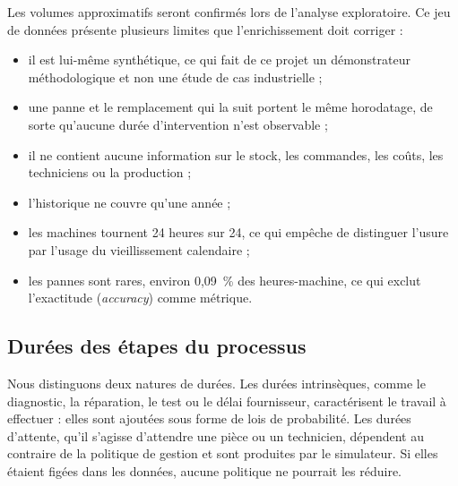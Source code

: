 \documentclass[11pt,a4paper]{article}
\begin{document}
Les volumes approximatifs seront confirmés lors de l'analyse exploratoire. Ce jeu de données présente plusieurs limites que l'enrichissement doit corriger :
\begin{itemize}
\item il est lui-même synthétique, ce qui fait de ce projet un démonstrateur méthodologique et non une étude de cas industrielle ;
\item une panne et le remplacement qui la suit portent le même horodatage, de sorte qu'aucune durée d'intervention n'est observable ;
\item il ne contient aucune information sur le stock, les commandes, les coûts, les techniciens ou la production ;
\item l'historique ne couvre qu'une année ;
\item les machines tournent 24 heures sur 24, ce qui empêche de distinguer l'usure par l'usage du vieillissement calendaire ;
\item les pannes sont rares, environ 0,09~\% des heures-machine, ce qui exclut l'exactitude (\emph{accuracy}) comme métrique.
\end{itemize}

\subsection{Durées des étapes du processus}

Nous distinguons deux natures de durées. Les durées intrinsèques, comme le diagnostic, la réparation, le test ou le délai fournisseur, caractérisent le travail à effectuer : elles sont ajoutées sous forme de lois de probabilité. Les durées d'attente, qu'il s'agisse d'attendre une pièce ou un technicien, dépendent au contraire de la politique de gestion et sont produites par le simulateur. Si elles étaient figées dans les données, aucune politique ne pourrait les réduire.
\end{document}
